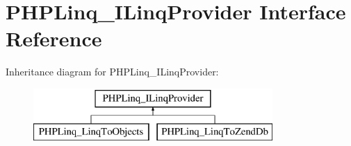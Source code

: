 \hypertarget{interface_p_h_p_linq___i_linq_provider}{\section{\-P\-H\-P\-Linq\-\_\-\-I\-Linq\-Provider \-Interface \-Reference}
\label{interface_p_h_p_linq___i_linq_provider}
}
\-Inheritance diagram for \-P\-H\-P\-Linq\-\_\-\-I\-Linq\-Provider\-:\begin{figure}[H]
\begin{center}
\leavevmode
\includegraphics[height=2.000000cm]{interface_p_h_p_linq___i_linq_provider}
\end{center}
\end{figure}
